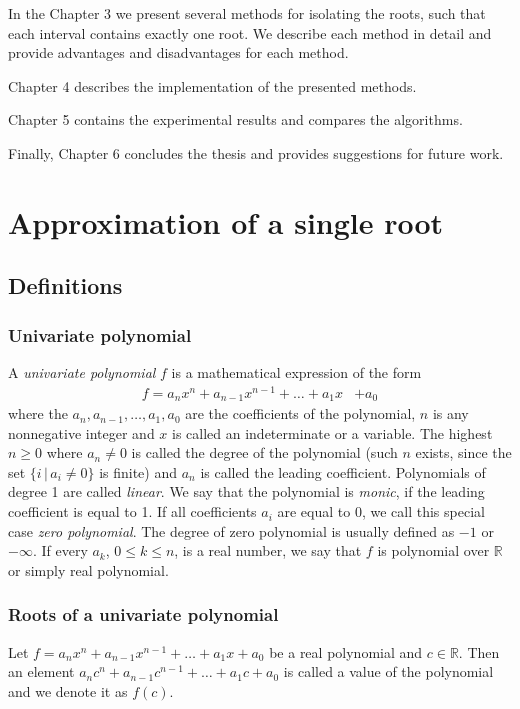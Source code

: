 \documentclass[
  digital, %
  notable,   %
  nolof,     %
  nolot,     %
	final, %
]{fithesis3}
\begin{document}
In the Chapter 3 we present several methods for isolating the roots, such that each interval contains exactly one root. We describe each method in detail and provide advantages and disadvantages for each method.

Chapter 4 describes the implementation of the presented methods.

Chapter 5 contains the experimental results and compares the algorithms.

Finally, Chapter 6 concludes the thesis and provides suggestions for future work.

\chapter{Approximation of a single root}
\section{Definitions}
\subsection{Univariate polynomial}
A \emph{univariate polynomial} $f$ is a mathematical expression of the form
\begin{align}
       f = a_{n}x^{n}  +  a_{n-1}x^{n-1} +  \ldots  +  a_{1}x  &+  a_{0} \label{eq:polynom}
\end{align}
\newcommand{\R}{\mathbb{R}}
\newcommand{\N}{\mathbb{N}}
where the $a_{n}, a_{n-1}, \ldots, a_{1}, a_{0}$  are the coefficients of the polynomial, $n$ is any nonnegative integer and $x$ is called an indeterminate or a variable.  The highest $n \geq 0$ where $a_{n} \neq 0$ is called the degree of the polynomial (such $n$ exists, since the set $\{i \, | \, a_{i} \neq 0 \}$ is finite) and $a_{n}$ is called the leading coefficient. Polynomials of degree 1 are called \emph{linear}. We say that the polynomial is \emph{monic}, if the leading coefficient is equal to 1. If all coefficients $a_{i}$ are equal to $0$, we call this special case \emph{zero polynomial}. The degree of zero polynomial is usually defined as $-1$ or $-\infty$. If every $a_{k}$, $0\leq{k}\leq{n}$, is a real number, we say that $f$ is polynomial over $\R$ or simply real polynomial.

\subsection{Roots of a univariate polynomial}
Let $f = a_{n}x^{n}  +  a_{n-1}x^{n-1} +  \ldots  +  a_{1}x  +  a_{0}$ be a real polynomial and $c\in\R$. Then an element $a_{n}c^{n}  +  a_{n-1}c^{n-1} +  \ldots  +  a_{1}c  +  a_{0}$ is called a value of the polynomial and we denote it as $f(c)$.
\end{document}
